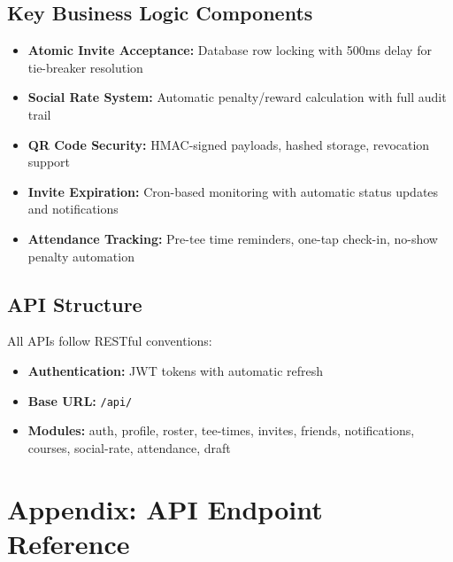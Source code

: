 \documentclass[11pt,a4paper]{article}
\begin{document}
\subsection{Key Business Logic Components}

\begin{itemize}[leftmargin=*]
  \item \textbf{Atomic Invite Acceptance:} Database row locking with 500ms delay for tie-breaker resolution
  \item \textbf{Social Rate System:} Automatic penalty/reward calculation with full audit trail
  \item \textbf{QR Code Security:} HMAC-signed payloads, hashed storage, revocation support
  \item \textbf{Invite Expiration:} Cron-based monitoring with automatic status updates and notifications
  \item \textbf{Attendance Tracking:} Pre-tee time reminders, one-tap check-in, no-show penalty automation
\end{itemize}

\subsection{API Structure}

All APIs follow RESTful conventions:
\begin{itemize}[leftmargin=*]
  \item \textbf{Authentication:} JWT tokens with automatic refresh
  \item \textbf{Base URL:} \texttt{/api/}
  \item \textbf{Modules:} auth, profile, roster, tee-times, invites, friends, notifications, courses, social-rate, attendance, draft
\end{itemize}

\section{Appendix: API Endpoint Reference}
\end{document}
